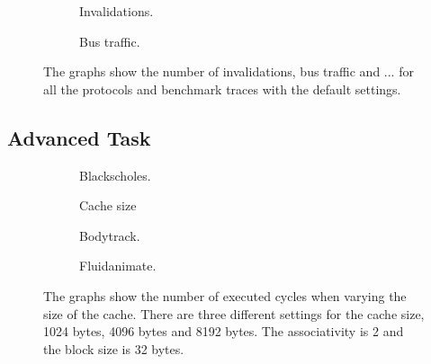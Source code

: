 \begin{figure}[H]
    \centering
    \begin{subfigure}[b]{0.33\textwidth}
        \centering
        \caption{Invalidations.}
        \label{fig:invalidations}
    \end{subfigure}%
    \hfill
    \begin{subfigure}[b]{0.33\textwidth}
        \centering
        \caption{Bus traffic.}
        \label{fig:bus_traffic}
    \end{subfigure}%
    \hfill
    \begin{subfigure}[b]{0.33\textwidth}
        \centering
        \caption{}
        \label{fig:}
    \end{subfigure}
    \hfill
    \caption{The graphs show the number of invalidations, bus traffic and ... for all the protocols and benchmark traces with the default settings.}
    \label{fig:}
\end{figure}

\subsection{Advanced Task}\label{results:advanced}

\begin{figure}[H]
    \centering
    \begin{subfigure}[b]{0.33\textwidth}
        \centering
        \caption{Blackscholes.}
        \label{fig:cache_size_blackscholes_advanced}
    \end{subfigure}%
    \hfill
    \begin{subfigure}[b]{0.33\textwidth}
        \centering
        Cache size\par\medskip
        \caption{Bodytrack.}
        \label{fig:cache_size_bodytrack_advanced}
    \end{subfigure}%
    \hfill
    \begin{subfigure}[b]{0.33\textwidth}
        \centering
        \caption{Fluidanimate.}
        \label{fig:cache_size_fluidanimate_advanced}
    \end{subfigure}
    \hfill
    \caption{The graphs show the number of executed cycles when varying the size of the cache. There are three different settings for the cache size, 1024 bytes, 4096 bytes and 8192 bytes. The associativity is 2 and the block size is 32 bytes.}
    \label{fig:cache_size}
\end{figure}

